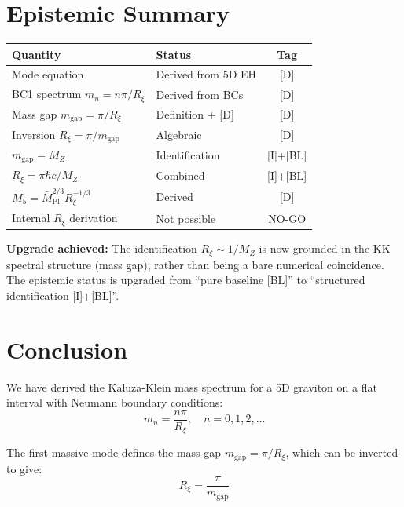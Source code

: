\documentclass[11pt,a4paper]{article}
\newcommand{\Rxi}{R_\xi}
\newcommand{\Mplbar}{\bar{M}_{\mathrm{Pl}}}
\newcommand{\Mfive}{M_5}
\newcommand{\MZ}{M_Z}
\newcommand{\mgap}{m_{\mathrm{gap}}}
\begin{document}
\section{Epistemic Summary}

\begin{center}
\begin{tabular}{llc}
\toprule
\textbf{Quantity} & \textbf{Status} & \textbf{Tag} \\
\midrule
Mode equation & Derived from 5D EH & [D] \\
BC1 spectrum $m_n = n\pi/\Rxi$ & Derived from BCs & [D] \\
Mass gap $\mgap = \pi/\Rxi$ & Definition + [D] & [D] \\
Inversion $\Rxi = \pi/\mgap$ & Algebraic & [D] \\
$\mgap = \MZ$ & Identification & [I]+[BL] \\
$\Rxi = \pi\hbar c/\MZ$ & Combined & [I]+[BL] \\
$\Mfive = \Mplbar^{2/3}\Rxi^{-1/3}$ & Derived & [D] \\
Internal $\Rxi$ derivation & Not possible & NO-GO \\
\bottomrule
\end{tabular}
\end{center}

\textbf{Upgrade achieved:} The identification $\Rxi \sim 1/\MZ$ is now grounded
in the KK spectral structure (mass gap), rather than being a bare numerical
coincidence. The epistemic status is upgraded from ``pure baseline [BL]'' to
``structured identification [I]+[BL]''.

\section{Conclusion}

We have derived the Kaluza-Klein mass spectrum for a 5D graviton on a flat interval
with Neumann boundary conditions:
\begin{equation}
m_n = \frac{n\pi}{\Rxi}, \quad n = 0, 1, 2, \ldots
\end{equation}

The first massive mode defines the mass gap $\mgap = \pi/\Rxi$, which can be
inverted to give:
\begin{equation}
\Rxi = \frac{\pi}{\mgap}
\end{equation}
\end{document}
